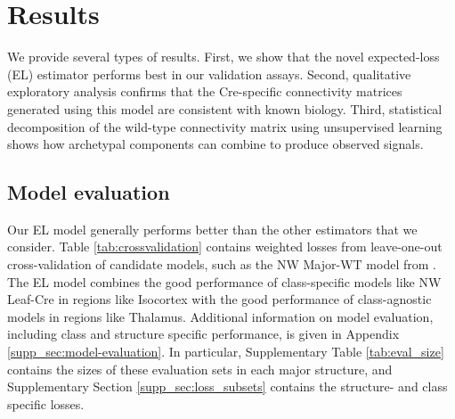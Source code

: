 \section{Results}
\label{sec:results}

We provide several types of results.
First, we show that the novel expected-loss (EL) estimator performs best in our validation assays.
Second, qualitative exploratory analysis confirms that the Cre-specific connectivity matrices generated using this model are consistent with known biology. 
Third, statistical decomposition of the wild-type connectivity matrix using unsupervised learning shows how archetypal components can combine to produce observed signals.

\subsection{Model evaluation}
\label{sec:model_eval}

Our EL model generally performs better than the other estimators that we consider.
Table \ref{tab:crossvalidation} contains weighted losses from leave-one-out cross-validation of candidate models, such as the NW Major-WT model from  \citet{Knox2019-ot}.
The EL model combines the good performance of class-specific models like NW Leaf-Cre in regions like Isocortex with the good performance of class-agnostic models in regions like Thalamus.
Additional information on model evaluation, including class and structure specific performance, is given in Appendix \ref{supp_sec:model-evaluation}.
In particular, Supplementary Table \ref{tab:eval_size} contains the sizes of these evaluation sets in each major structure, and Supplementary Section \ref{supp_sec:loss_subsets} contains the structure- and class specific losses.

